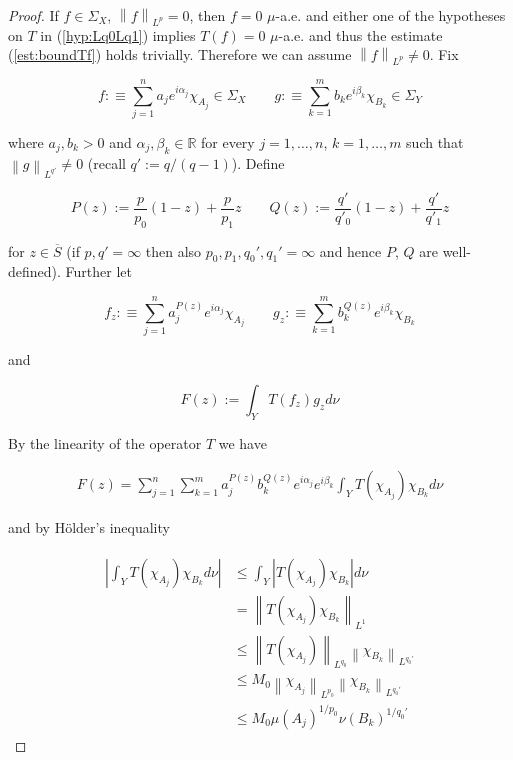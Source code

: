 \begin{proof}
	If $f \in \Sigma_X$, $\left\| f \right\|_{L^p} = 0$, then $f = 0$ $\mu$-a.e. and either one of the hypotheses on $T$ in (\ref{hyp:Lq0Lq1}) implies $T(f) = 0$ $\mu$-a.e. and thus the estimate (\ref{est:boundTf}) holds trivially. Therefore we can assume $\left\| f\right\|_{L^p} \neq 0$. Fix 
	
\begin{equation*}
	f :\equiv \sum_{j = 1}^n a_j e^{i\alpha_j}\chi_{A_j} \in \Sigma_X \qquad g :\equiv \sum_{k = 1}^m b_k e^{i\beta_k}\chi_{B_k} \in \Sigma_Y
\end{equation*}

where $a_j, b_k > 0$ and $\alpha_j, \beta_k \in \mathbb{R}$ for every $j = 1,\hdots,n$, $k = 1,\hdots,m$ such that $\left\| g\right\|_{L^{q'}} \neq 0$ (recall $q' := q/\left( q - 1 \right)$). Define

\begin{equation*}
	P(z) := \frac{p}{p_0}(1 - z) + \frac{p}{p_1}z \qquad Q(z) := \frac{q'}{q'_0}(1 - z) + \frac{q'}{q'_1}z
\end{equation*}

	for $z \in \overline{S}$ (if $p,q' = \infty$ then also $p_0,p_1,q_0',q_1' = \infty $ and hence $P$, $Q$ are well-defined). Further let
				
\begin{equation}
	f_z :\equiv \sum_{j = 1}^n a^{P(z)}_j e^{i\alpha_j}\chi_{A_j} \qquad g_z :\equiv  \sum_{k = 1}^m b^{Q(z)}_k e^{i\beta_k}\chi_{B_k}
	\label{def:fzgz}
\end{equation}
				
and 

\begin{equation}
	F(z) := \int_Y T(f_z)g_zd\nu
	\label{eq:def_F}
\end{equation}

By the linearity of the operator $T$ we have

\begin{gather*}
	F(z) = \sum_{j = 1}^n\sum_{k = 1}^m a^{P(z)}_j b_k^{Q(z)} e^{i\alpha_j} e^{i\beta_k} \int_YT(\chi_{A_j})\chi_{B_k}d\nu
\end{gather*}

and by H\"older's inequality

\begin{gather}
	\begin{aligned}
		\left| \int_YT(\chi_{A_j})\chi_{B_k}d\nu \right| &\leqslant \int_Y\left| T(\chi_{A_j})\chi_{B_k}\right|d\nu\\
		&= \left\|T(\chi_{A_j})\chi_{B_k}\right\|_{L^1}\\
		&\leqslant \left\|T(\chi_{A_j})\right\|_{L^{q_0}} \left\|\chi_{B_k}\right\|_{L^{q_0'}}\\
		&\leqslant M_0\left\|\chi_{A_j}\right\|_{L^{p_0}} \left\|\chi_{B_k}\right\|_{L^{q_0'}}\\
		&\leqslant M_0 \mu\left(A_j\right)^{1/p_0}\nu\left(B_k\right)^{1/q_0'}
	\end{aligned}
	\label{est:constant_F}
\end{gather}


\end{proof}
